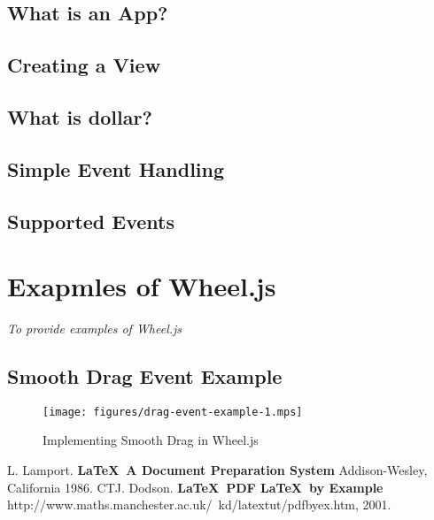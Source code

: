 \documentclass[16pt]{book}
\begin{document}

\section{What is an App?} %
\label{sec:What is an App?}


\section{Creating a View} %
\label{sec:Creating a View}


\section{What is dollar?} %
\label{sec:What is dollar?}


\section{Simple Event Handling} %
\label{sec:Simple Event Handling}


\section{Supported Events} %
\label{sec:Supported Events}

\newpage
\chapter{Exapmles of Wheel.js}
\begin{center}
{\small\em To provide examples of Wheel.js}
\end{center}

\section{Smooth Drag Event Example} %
\label{sec:Smooth Drag Event Example}

\begin{figure}[H] %
\begin{center}
\texttt{[image: figures/drag-event-example-1.mps]}
\end{center}
  \caption{Implementing Smooth Drag in Wheel.js}
\end{figure}
\newpage

\begin{thebibliography}{99}
 L. Lamport. {\bf \LaTeX \ A Document Preparation System}
Addison-Wesley, California 1986.
 CTJ. Dodson. {\bf \LaTeX \ PDF \LaTeX \ by Example}
http://www.maths.manchester.ac.uk/~kd/latextut/pdfbyex.htm, 2001.
\end{thebibliography}
\end{document}
